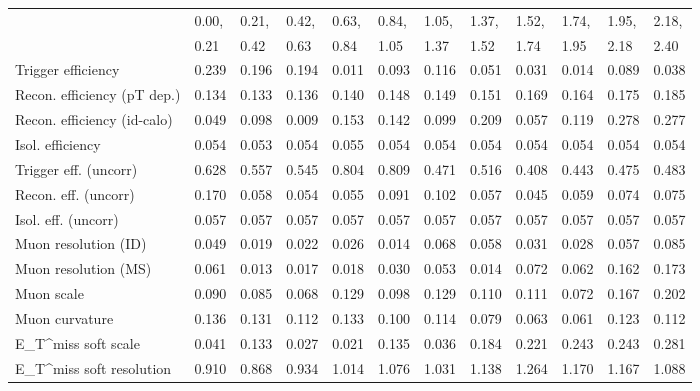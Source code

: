 \begin{tabular}{l|p{0.6cm}p{0.6cm}p{0.6cm}p{0.6cm}p{0.6cm}p{0.6cm}p{0.6cm}p{0.6cm}p{0.6cm}p{0.6cm}p{0.6cm}}
\hline
   & 0.00, & 0.21, & 0.42, & 0.63, & 0.84, & 1.05, & 1.37, & 1.52, & 1.74, & 1.95, & 2.18,  \\ 
   & 0.21 & 0.42 & 0.63 & 0.84 & 1.05 & 1.37 & 1.52 & 1.74 & 1.95 & 2.18 & 2.40  \\ 
\hline
Trigger efficiency                       & 0.239 & 0.196 & 0.194 & 0.011 & 0.093 & 0.116 & 0.051 & 0.031 & 0.014 & 0.089 & 0.038 \\
Recon. efficiency (pT dep.)              & 0.134 & 0.133 & 0.136 & 0.140 & 0.148 & 0.149 & 0.151 & 0.169 & 0.164 & 0.175 & 0.185 \\
Recon. efficiency (id-calo)              & 0.049 & 0.098 & 0.009 & 0.153 & 0.142 & 0.099 & 0.209 & 0.057 & 0.119 & 0.278 & 0.277 \\
Isol. efficiency                         & 0.054 & 0.053 & 0.054 & 0.055 & 0.054 & 0.054 & 0.054 & 0.054 & 0.054 & 0.054 & 0.054 \\
Trigger eff. (uncorr)                    & 0.628 & 0.557 & 0.545 & 0.804 & 0.809 & 0.471 & 0.516 & 0.408 & 0.443 & 0.475 & 0.483 \\
Recon. eff. (uncorr)                     & 0.170 & 0.058 & 0.054 & 0.055 & 0.091 & 0.102 & 0.057 & 0.045 & 0.059 & 0.074 & 0.075 \\
Isol. eff. (uncorr)                      & 0.057 & 0.057 & 0.057 & 0.057 & 0.057 & 0.057 & 0.057 & 0.057 & 0.057 & 0.057 & 0.057 \\
Muon resolution (ID)                     & 0.049 & 0.019 & 0.022 & 0.026 & 0.014 & 0.068 & 0.058 & 0.031 & 0.028 & 0.057 & 0.085 \\
Muon resolution (MS)                     & 0.061 & 0.013 & 0.017 & 0.018 & 0.030 & 0.053 & 0.014 & 0.072 & 0.062 & 0.162 & 0.173 \\
Muon scale                               & 0.090 & 0.085 & 0.068 & 0.129 & 0.098 & 0.129 & 0.110 & 0.111 & 0.072 & 0.167 & 0.202 \\
Muon curvature                           & 0.136 & 0.131 & 0.112 & 0.133 & 0.100 & 0.114 & 0.079 & 0.063 & 0.061 & 0.123 & 0.112 \\
E_{T}^{miss} soft scale                  & 0.041 & 0.133 & 0.027 & 0.021 & 0.135 & 0.036 & 0.184 & 0.221 & 0.243 & 0.243 & 0.281 \\
E_{T}^{miss} soft resolution             & 0.910 & 0.868 & 0.934 & 1.014 & 1.076 & 1.031 & 1.138 & 1.264 & 1.170 & 1.167 & 1.088 \\

\end{tabular}
